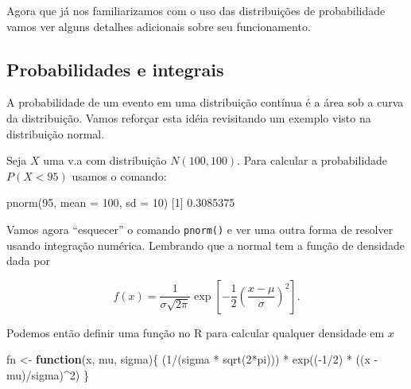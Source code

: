 \documentclass[
  10pt,
  a4paper]{book}
\newenvironment{Shaded}{\begin{snugshade}}{\end{snugshade}}
\newcommand{\AttributeTok}[1]{\textcolor[rgb]{0.77,0.63,0.00}{#1}}
\newcommand{\ControlFlowTok}[1]{\textcolor[rgb]{0.13,0.29,0.53}{\textbf{#1}}}
\newcommand{\DecValTok}[1]{\textcolor[rgb]{0.00,0.00,0.81}{#1}}
\newcommand{\FloatTok}[1]{\textcolor[rgb]{0.00,0.00,0.81}{#1}}
\newcommand{\FunctionTok}[1]{\textcolor[rgb]{0.00,0.00,0.00}{#1}}
\newcommand{\NormalTok}[1]{#1}
\newcommand{\OtherTok}[1]{\textcolor[rgb]{0.56,0.35,0.01}{#1}}
\newcommand{\SpecialCharTok}[1]{\textcolor[rgb]{0.00,0.00,0.00}{#1}}
\begin{document}
Agora que já nos familiarizamos com o uso das distribuições de
probabilidade vamos ver alguns detalhes adicionais sobre seu
funcionamento.

\hypertarget{probabilidades-e-integrais}{%
\subsection{Probabilidades e integrais}\label{probabilidades-e-integrais}}

A probabilidade de um evento em uma distribuição contínua é a área sob
a curva da distribuição. Vamos reforçar esta idéia revisitando um
exemplo visto na distribuição normal.

Seja \(X\) uma v.a com distribuição \(N(100, 100)\). Para calcular a
probabilidade \(P(X < 95)\) usamos o comando:

\begin{Shaded}
\begin{Highlighting}[]
\FunctionTok{pnorm}\NormalTok{(}\DecValTok{95}\NormalTok{, }\AttributeTok{mean =} \DecValTok{100}\NormalTok{, }\AttributeTok{sd =} \DecValTok{10}\NormalTok{)}
\NormalTok{[}\DecValTok{1}\NormalTok{] }\FloatTok{0.3085375}
\end{Highlighting}
\end{Shaded}

Vamos agora ``esquecer'' o comando \texttt{pnorm()} e ver uma outra forma de
resolver usando integração numérica. Lembrando que a normal tem a função
de densidade dada por

\[
f(x) = \frac{1}{\sigma\sqrt{2 \pi}}\exp \left[ -\frac{1}{2}
    \left( \frac{x - \mu}{\sigma} \right)^2 \right].
\]

Podemos então definir uma função no R para calcular qualquer densidade
em \(x\)

\begin{Shaded}
\begin{Highlighting}[]
\NormalTok{fn }\OtherTok{\textless{}{-}} \ControlFlowTok{function}\NormalTok{(x, mu, sigma)\{}
\NormalTok{    (}\DecValTok{1}\SpecialCharTok{/}\NormalTok{(sigma }\SpecialCharTok{*} \FunctionTok{sqrt}\NormalTok{(}\DecValTok{2}\SpecialCharTok{*}\NormalTok{pi))) }\SpecialCharTok{*} \FunctionTok{exp}\NormalTok{((}\SpecialCharTok{{-}}\DecValTok{1}\SpecialCharTok{/}\DecValTok{2}\NormalTok{) }\SpecialCharTok{*}\NormalTok{ ((x }\SpecialCharTok{{-}}\NormalTok{ mu)}\SpecialCharTok{/}\NormalTok{sigma)}\SpecialCharTok{\^{}}\DecValTok{2}\NormalTok{)}
\NormalTok{\}}
\end{Highlighting}
\end{Shaded}
\end{document}
